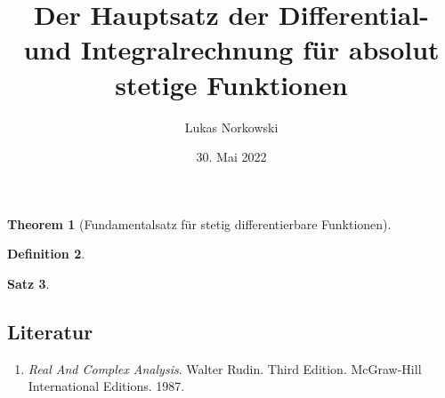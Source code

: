 \documentclass[a4paper, ngerman]{article}
\title{Der Hauptsatz der Differential- und Integralrechnung für absolut stetige Funktionen}
\author{Lukas Norkowski}
\date{30. Mai 2022}
\theoremstyle{mytheorem}
\newtheorem{theorem}{Theorem}
\newtheorem{satz}[theorem]{Satz}
\theoremstyle{definition}
\newtheorem{definition}[theorem]{Definition}
\begin{document}
	\maketitle
	\thispagestyle{empty}	

\begin{theorem}[Fundamentalsatz für stetig differentierbare Funktionen]
	
\end{theorem}

\begin{definition}
	
\end{definition}

\begin{satz}
  
\end{satz}

\subsection*{Literatur}
\begin{enumerate}
	\item \emph{Real And Complex Analysis}. Walter Rudin. Third Edition. McGraw-Hill International Editions. 1987.
\end{enumerate}
\end{document}
